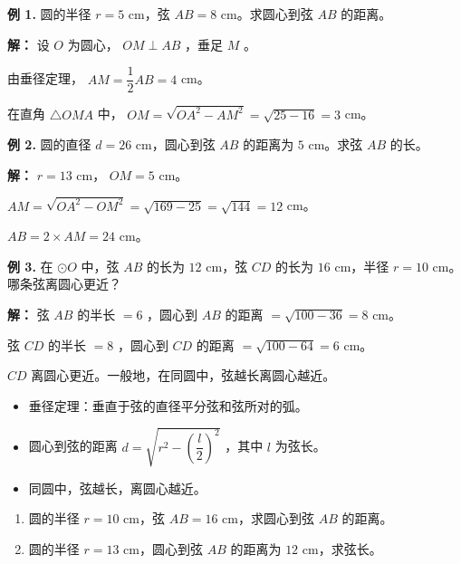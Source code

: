 \begin{workedexamples}


\textbf{例 1.} 圆的半径 $r = 5$ cm，弦 $AB = 8$ cm。求圆心到弦 $AB$ 的距离。

\textbf{解：}
设 $O$ 为圆心， $OM \perp AB$ ，垂足 $M$ 。

由垂径定理， $AM = \dfrac{1}{2}AB = 4$ cm。

在直角 $\triangle OMA$ 中， $OM = \sqrt{OA^2 - AM^2} = \sqrt{25 - 16} = 3$ cm。

\textbf{例 2.} 圆的直径 $d = 26$ cm，圆心到弦 $AB$ 的距离为 $5$ cm。求弦 $AB$ 的长。

\textbf{解：}
$r = 13$ cm， $OM = 5$ cm。

$AM = \sqrt{OA^2 - OM^2} = \sqrt{169 - 25} = \sqrt{144} = 12$ cm。

$AB = 2 \times AM = 24$ cm。

\textbf{例 3.} 在 $\odot O$ 中，弦 $AB$ 的长为 $12$ cm，弦 $CD$ 的长为 $16$ cm，半径 $r = 10$ cm。哪条弦离圆心更近？

\textbf{解：}
弦 $AB$ 的半长 $= 6$ ，圆心到 $AB$ 的距离 $= \sqrt{100 - 36} = 8$ cm。

弦 $CD$ 的半长 $= 8$ ，圆心到 $CD$ 的距离 $= \sqrt{100 - 64} = 6$ cm。

$CD$ 离圆心更近。一般地，在同圆中，弦越长离圆心越近。

\end{workedexamples}

\begin{keytakeaway}


\begin{itemize}
  \item 垂径定理：垂直于弦的直径平分弦和弦所对的弧。
  \item 圆心到弦的距离 $d = \sqrt{r^2 - \left(\dfrac{l}{2}\right)^2}$ ，其中 $l$ 为弦长。
  \item 同圆中，弦越长，离圆心越近。
\end{itemize}


\end{keytakeaway}

\begin{practice}


\begin{enumerate}
  \item 圆的半径 $r = 10$ cm，弦 $AB = 16$ cm，求圆心到弦 $AB$ 的距离。
  \item 圆的半径 $r = 13$ cm，圆心到弦 $AB$ 的距离为 $12$ cm，求弦长。
\end{enumerate}


\end{practice}



